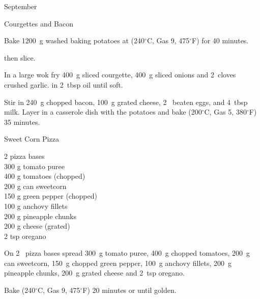 \begin{menu}{September}
\begin{recipe}{2}{Courgettes and Bacon}
\begin{ingredients}
		\end{ingredients}
	
    \begin{instructions}
    \item 
      Bake 
      1200~g washed baking potatoes
      at
      (240$^{\circ}$C, Gas 9, 475$^{\circ}$F) for 40 minutes.
    
        then slice.
      \item 
        In a large wok fry
        400~g sliced courgette,
        400~g sliced onions
        and
        2~cloves crushed garlic.
        in
        2~tbsp  oil
        until soft.
      \item 
        Stir in
        240~g chopped bacon,
        100~g grated cheese,
        2~ beaten eggs,
        and
        4~tbsp  milk.
        Layer in a casserole dish
        with the potatoes
        and bake (200$^{\circ}$C, Gas 5, 380$^{\circ}$F) 35 minutes.
      
    \end{instructions}
    \end{recipe}%
  
    \begin{recipe}{2}{Sweet Corn Pizza}%
		\begin{ingredients}
		2  pizza bases  \\
	300 g tomato puree  \\
	400 g tomatoes (chopped) \\
	200 g can sweetcorn  \\
	150 g green pepper (chopped) \\
	100 g anchovy fillets  \\
	200 g pineapple chunks  \\
	200 g cheese (grated) \\
	2 tsp oregano  \\
	
		\end{ingredients}
	
	
    \begin{instructions}
    \item 
        On
        2~  pizza bases
        spread
        300~g  tomato puree,
        400~g chopped tomatoes,
        200~g  can sweetcorn,
        150~g chopped green pepper,
        100~g  anchovy fillets,
        200~g  pineapple chunks,
        200~g grated cheese
        and
        2~tsp  oregano.
      \item 
        Bake (240$^{\circ}$C, Gas 9, 475$^{\circ}$F) 20 minutes or until golden.
      

\end{instructions}
\end{recipe}
\end{menu}
